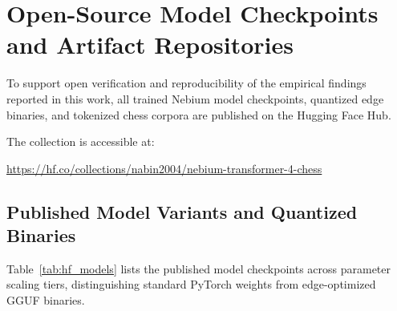 \section{Open-Source Model Checkpoints and Artifact Repositories}
\label{sec:model_appendix}

To support open verification and reproducibility of the empirical findings reported in this work, all trained Nebium model checkpoints, quantized edge binaries, and tokenized chess corpora are published on the Hugging Face Hub.

The collection is accessible at:
\begin{center}
\small
\url{https://hf.co/collections/nabin2004/nebium-transformer-4-chess}
\end{center}

\subsection{Published Model Variants and Quantized Binaries}
\label{sec:appendix_models_table}

Table~\ref{tab:hf_models} lists the published model checkpoints across parameter scaling tiers, distinguishing standard PyTorch weights from edge-optimized GGUF binaries.

